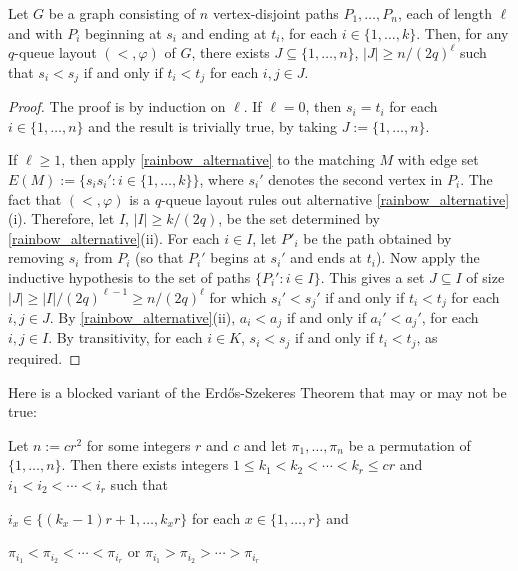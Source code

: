 \documentclass{patmorin}
\begin{document}
\begin{lem}\label{rainbow_alternative_paths}
    Let $G$ be a graph consisting of $n$ vertex-disjoint paths $P_1,\ldots,P_n$, each of length $\ell$ and with $P_i$ beginning at $s_i$ and ending at $t_i$, for each $i\in\{1,\ldots,k\}$.  Then, for any $q$-queue layout $(<,\varphi)$ of $G$, there exists $J\subseteq\{1,\ldots,n\}$, $|J|\ge n/(2q)^\ell$ such that $s_i<s_j$ if and only if $t_i<t_j$ for each $i,j\in J$.
\end{lem}

\begin{proof}
    The proof is by induction on $\ell$.  If $\ell=0$, then $s_i=t_i$ for each $i\in\{1,\ldots,n\}$ and the result is trivially true, by taking $J:=\{1,\ldots,n\}$.

    If $\ell\ge 1$, then apply \cref{rainbow_alternative} to the matching $M$ with edge set $E(M):=\{s_is_i':i\in\{1,\ldots,k\}\}$, where $s_i'$ denotes the second vertex in $P_i$.  The fact that $(<,\varphi)$ is a $q$-queue layout rules out alternative \cref{rainbow_alternative}(i).  Therefore, let $I$, $|I|\ge k/(2q)$, be the set determined by \cref{rainbow_alternative}(ii).  For each $i\in I$, let $P'_i$ be the path obtained by removing $s_i$ from $P_i$ (so that $P_i'$ begins at $s_i'$ and ends at $t_i$).  Now apply the inductive hypothesis to the set of paths $\{P_i':i\in I\}$.  This gives a set $J\subseteq I$ of size $|J|\ge |I|/(2q)^{\ell-1}\ge n/(2q)^\ell$ for which $s_i' < s_j'$ if and only if $t_i < t_j$ for each $i,j\in J$.  By \cref{rainbow_alternative}(ii), $a_i < a_j$ if and only if $a_i' < a_j'$, for each $i,j\in I$.  By transitivity, for each $i\in K$, $s_i < s_j$ if and only if $t_i< t_j$, as required.
\end{proof}

Here is a blocked variant of the Erd\H{o}s-Szekeres Theorem that may or may not be true:
\begin{lem}\label{block_erdos_szekeres}
    Let $n:=cr^2$ for some integers $r$ and $c$ and let $\pi_1,\ldots,\pi_n$ be a permutation of $\{1,\ldots,n\}$.  Then there exists integers $1\le k_1<k_2<\cdots<k_r\le cr$ and  $i_1<i_2<\cdots< i_r$ such that
    \begin{compactenum}[(i)]
        \item $i_x\in \{(k_x-1)r+1,\ldots,k_xr\}$ for each $x\in\{1,\ldots,r\}$ and
        \item $\pi_{i_1}<\pi_{i_2}<\cdots<\pi_{i_r}$ or  $\pi_{i_1}>\pi_{i_2}>\cdots>\pi_{i_r}$
    \end{compactenum}
\end{lem}
\end{document}
